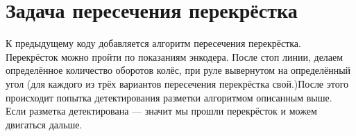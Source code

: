 \section{Задача пересечения перекрёстка}

К предыдущему коду добавляется алгоритм пересечения перекрёстка. Перекрёсток можно пройти по показаниям энкодера. После стоп линии, делаем определённое количество оборотов колёс, при руле вывернутом на определённый угол (для каждого из трёх вариантов пересечения перекрёстка свой.)После этого происходит попытка детектирования разметки алгоритмом описанным выше. Если разметка детектирована — значит мы прошли перекрёсток и можем двигаться дальше.

